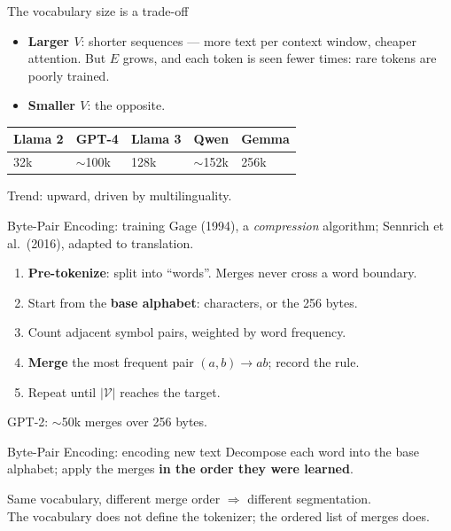 \documentclass[11pt,aspectratio=169]{beamer}
\newcommand{\V}{\mathcal{V}}
\newcommand{\dest}[1]{\textcolor{structure}{\textbf{#1}}}
\begin{document}
\begin{frame}{The vocabulary size is a trade-off}
  \begin{itemize}
    \item \dest{Larger $V$}: shorter sequences --- more text per context window, cheaper
          attention. But $E$ grows, and each token is seen fewer times: rare tokens are
          poorly trained.
    \item \dest{Smaller $V$}: the opposite.
  \end{itemize}

  \vspace{0.8em}
  \begin{center}
    \begin{tabular}{@{}lllll@{}}
      \toprule
      Llama 2 & GPT-4 & Llama 3 & Qwen & Gemma \\
      \midrule
      32k & $\sim$100k & 128k & $\sim$152k & 256k \\
      \bottomrule
    \end{tabular}
  \end{center}

  \vspace{0.6em}
  Trend: upward, driven by multilinguality.
\end{frame}

\begin{frame}{Byte-Pair Encoding: training}
  Gage (1994), a \emph{compression} algorithm; Sennrich et al.\ (2016), adapted to
  translation.

  \vspace{0.6em}
  \begin{enumerate}
    \item \dest{Pre-tokenize}: split into ``words''. Merges never cross a word boundary.
    \item Start from the \dest{base alphabet}: characters, or the 256 bytes.
    \item Count adjacent symbol pairs, weighted by word frequency.
    \item \dest{Merge} the most frequent pair $(a,b)\to ab$; record the rule.
    \item Repeat until $|\V|$ reaches the target.
  \end{enumerate}

  \vspace{0.6em}
  GPT-2: $\sim$50k merges over 256 bytes.
\end{frame}

\begin{frame}{Byte-Pair Encoding: encoding new text}
  Decompose each word into the base alphabet; apply the merges \dest{in the order they were
  learned}.

  \vspace{1.2em}
  \begin{block}{}
    Same vocabulary, different merge order $\Rightarrow$ different segmentation.\\
    The vocabulary does not define the tokenizer; the ordered list of merges does.
  \end{block}
\end{frame}
\end{document}
